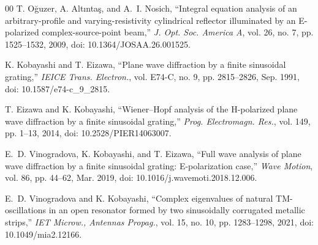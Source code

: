 \documentclass[conference]{IEEEtran}
\begin{document}
\begin{thebibliography}{00}
T. O\u{g}uzer, A. Alt\i nta\c{s}, and A.~I. Nosich, ``Integral equation analysis 
of an arbitrary-profile and varying-resistivity cylindrical reflector illuminated 
by an E-polarized complex-source-point beam,'' \emph{J. Opt. Soc. America A}, 
vol. 26, no. 7, pp. 1525--1532, 2009, doi: 10.1364/JOSAA.26.001525.

K. Kobayashi and T. Eizawa, ``Plane wave diffraction by a finite sinusoidal
grating,'' \emph{IEICE Trans. Electron.}, vol. E74-C, no. 9, pp. 2815--2826,
Sep. 1991, doi: 10.1587/e74-c\_9\_2815.

T. Eizawa and K. Kobayashi, ``Wiener--Hopf analysis of the H-polarized plane
wave diffraction by a finite sinusoidal grating,'' \emph{Prog.
Electromagn. Res.}, vol. 149, pp. 1--13, 2014,
doi: 10.2528/PIER14063007.

{}
E.~D. Vinogradova, K. Kobayashi, and T. Eizawa, ``Full wave analysis of plane
wave diffraction by a finite sinusoidal grating: E-polarization case,''
\emph{Wave Motion}, vol. 86, pp. 44--62, Mar. 2019,
doi: 10.1016/j.wavemoti.2018.12.006.

E.~D. Vinogradova and K. Kobayashi, ``Complex eigenvalues of natural
TM-oscillations in an open resonator formed by two sinusoidally corrugated
metallic strips,'' \emph{IET Microw., Antennas Propag.}, vol. 15, no. 10,
pp. 1283--1298, 2021, doi: 10.1049/mia2.12166.

\end{thebibliography}
\end{document}
